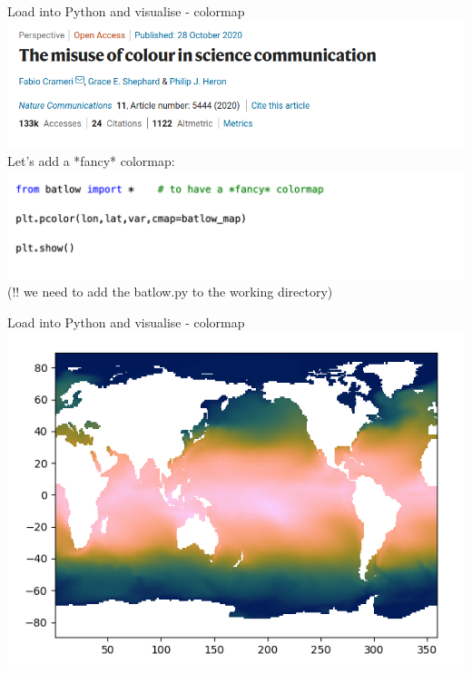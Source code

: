  
\begin{frame}{\insertsectionnumber{ |} Load into Python and visualise - colormap} 
    \includegraphics[scale=0.35]{images/Nature.png}\\
        \vspace{0.5cm}
     Let's add a *fancy* colormap:\\
    \includegraphics[scale=0.35]{images/Script1_step5.png}\\
        \vspace{0.3cm}
    (!! we need to add the batlow.py to the working directory)\\
\end{frame}
 
 
\begin{frame}{\insertsectionnumber{ |} Load into Python and visualise - colormap} 
    \vspace{0.5cm}
    \includegraphics[scale=0.45]{images/Script1_fig3.png}
\end{frame}
 
